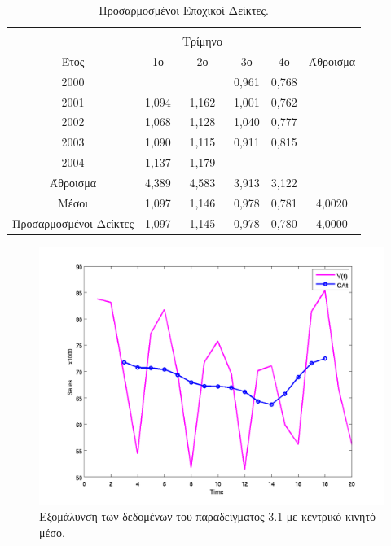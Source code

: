 \begin{table} [h]
\begin{center}
\begin{tabular}{|c|c|c|c|c|c|c|c|}
      \hline
    \end{tabular}
  \end{center}
\end{table}

\begin{table} [h]
  \caption{Προσαρμοσμένοι Εποχικοί Δείκτες.} 
  \label{tab_2}
  \begin{center}
    \begin{tabular}{|c|c c c c|c|}
      \hline
      &  &  &  &  &\\
      &  &  Τρίμηνο &  &  & \\
   Έτος   & 1ο & 2ο & 3ο  & 4ο  & Άθροισμα \\
   \hline \hline
   2000&   &  & 0,961 &0,768  &  \\
   2001  &1,094  & 1,162 & 1,001 &0,762 &  \\
   2002& 1,068 & 1,128 & 1,040 & 0,777 &  \\
    2003& 1,090 & 1,115 & 0,911 & 0,815 &  \\  
    2004& 1,137 & 1,179 &  &  &  \\
    \hline
    Άθροισμα & 4,389 & 4,583 &3,913  & 3,122 &  \\
    Μέσοι& 1,097 & 1,146 & 0,978 & 0,781 & 4,0020 \\
    Προσαρμοσμένοι Δείκτες& 1,097 &1,145 & 0,978 & 0,780 & 4,0000 \\
      \hline
    \end{tabular}
  \end{center}
\end{table}

\begin{figure} [ht]
  \centering
  \includegraphics[totalheight=3.2in,angle=0]{graff2.png}
  \caption{Εξομάλυνση των δεδομένων του παραδείγματος 3.1 με κεντρικό κινητό μέσο.}
\end{figure}
 

